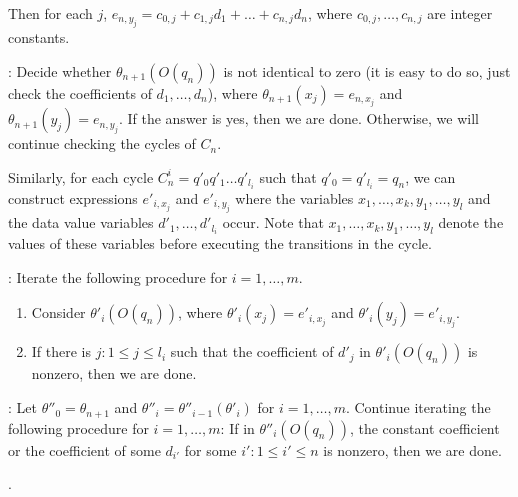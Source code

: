 Then for each $j$, $e_{n,y_j} = c_{0,j} + c_{1,j} d_1 + \dots + c_{n,j} d_n$, where $c_{0,j},\dots, c_{n,j}$ are integer constants.

\smallskip

: Decide whether $\theta_{n+1}(O(q_n))$ is not identical to zero (it is easy to do so, just check the coefficients of $d_1,\dots,d_n$), where $\theta_{n+1}(x_j)=e_{n,x_j}$ and $\theta_{n+1}(y_j)=e_{n,y_j}$. If the answer is yes, then we are done. Otherwise, we will continue checking the cycles of $C_n$.

Similarly, for each cycle $C^i_n = q'_0 q'_1 \dots q'_{l_i}$ such that $q'_0 = q'_{l_i}=q_n$, we can construct expressions $e'_{i,x_j}$ and $e'_{i,y_j}$ where the variables $x_1,\dots,x_k,y_1,\dots,y_l$ and the data value variables $d'_1,\dots,d'_{l_i}$ occur. Note that $x_1,\dots,x_k,y_1,\dots,y_l$ denote the values of these variables before executing the transitions in the cycle.

\smallskip

: Iterate the following procedure for $i = 1, \dots, m$.
\begin{enumerate}
\item Consider $\theta'_i(O(q_n))$, where $\theta'_i(x_j)=e'_{i,x_j}$ and $\theta'_i(y_j)=e'_{i,y_j}$. 
%
\item If there is $j: 1 \le j \le l_i$ such that the coefficient of $d'_j$ in $\theta'_i(O(q_n))$ is nonzero, then we are done. 
\end{enumerate}

\smallskip

: Let $\theta''_0=\theta_{n+1}$ and $\theta''_i = \theta''_{i-1}(\theta'_i)$ for $i = 1, \dots, m$.  Continue iterating the following procedure for $i = 1, \dots, m$:   If in $\theta''_i(O(q_n))$, the constant coefficient or the coefficient of some $d_{i'}$ for some $i': 1 \le i' \le n$ is nonzero, then we are done. 

.


